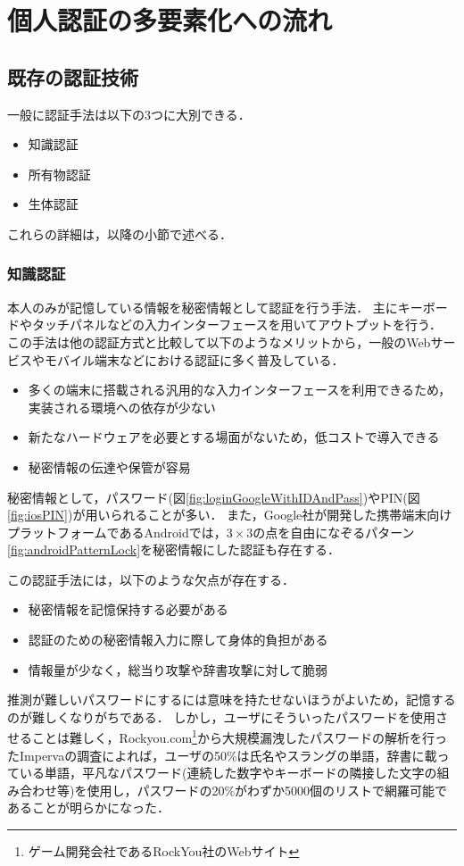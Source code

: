 \chapter{個人認証の多要素化への流れ}\label{chap:preparation}

\section{既存の認証技術}
一般に認証手法は以下の3つに大別できる．
\begin{itemize}
\item 知識認証
\item 所有物認証
\item 生体認証
\end{itemize}
これらの詳細は，以降の小節で述べる．

\subsection{知識認証}\label{subsec:knowledge}
本人のみが記憶している情報を秘密情報として認証を行う手法．
主にキーボードやタッチパネルなどの入力インターフェースを用いてアウトプットを行う．
この手法は他の認証方式と比較して以下のようなメリットから，一般のWebサービスやモバイル端末などにおける認証に多く普及している．
\begin{itemize}
\item 多くの端末に搭載される汎用的な入力インターフェースを利用できるため，実装される環境への依存が少ない
\item 新たなハードウェアを必要とする場面がないため，低コストで導入できる
\item 秘密情報の伝達や保管が容易
\end{itemize}
秘密情報として，パスワード(図\ref{fig:loginGoogleWithIDAndPass})やPIN(図\ref{fig:iosPIN})が用いられることが多い．
また，Google社が開発した携帯端末向けプラットフォームであるAndroidでは，$ 3 \times 3 $の点を自由になぞるパターン\ref{fig:androidPatternLock}を秘密情報にした認証も存在する．

この認証手法には，以下のような欠点が存在する．
\begin{itemize}
\item 秘密情報を記憶保持する必要がある
\item 認証のための秘密情報入力に際して身体的負担がある
\item 情報量が少なく，総当り攻撃や辞書攻撃に対して脆弱
\end{itemize}
推測が難しいパスワードにするには意味を持たせないほうがよいため，記憶するのが難しくなりがちである．
しかし，ユーザにそういったパスワードを使用させることは難しく，Rockyou.com\footnote{ゲーム開発会社であるRockYou社のWebサイト}から大規模漏洩したパスワードの解析を行ったImpervaの調査\cite{21password}によれば，ユーザの50\%は氏名やスラングの単語，辞書に載っている単語，平凡なパスワード(連続した数字やキーボードの隣接した文字の組み合わせ等)を使用し，パスワードの20\%がわずか5000個のリストで網羅可能であることが明らかになった．

